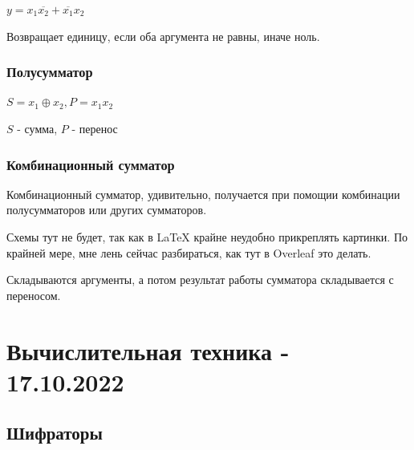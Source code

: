 \documentclass{article}
\begin{document}
$y = x_1\overline{x_2} + \overline{x_1}x_2$

Возвращает единицу, если оба аргумента не равны, иначе ноль.

\subsubsection{Полусумматор}

$S = x_1 \oplus x_2, P = x_{1}x_{2}$

$S$ - сумма, $P$ - перенос

\subsubsection{Комбинационный сумматор}

Комбинационный сумматор, удивительно, получается при помощии комбинации полусумматоров или других сумматоров.

Схемы тут не будет, так как в LaTeX крайне неудобно прикреплять картинки. По крайней мере, мне лень сейчас разбираться, как тут в Overleaf это делать.

Складываются аргументы, а потом результат работы сумматора складывается с переносом.

\pagebreak
\section{Вычислительная техника - 17.10.2022}

\subsection{Шифраторы}
\end{document}
